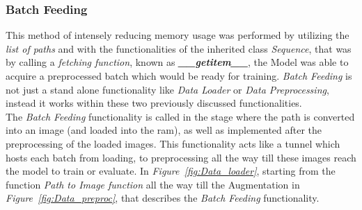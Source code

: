 \documentclass[12pt]{extarticle}
\begin{document}
	\subsubsection{Batch Feeding}\label{batching}
	This method of intensely reducing memory usage was performed by utilizing the \emph{list of paths} and with the functionalities of the inherited class \emph{Sequence}, that was by calling a \emph{fetching function}, known as \emph{\textbf{\_\_getitem\_\_}}, the Model was able to acquire a preprocessed batch which would be ready for training. \emph{Batch Feeding} is not just a stand alone functionality like \emph{Data Loader} or \emph{Data Preprocessing}, instead it works within these two previously discussed functionalities.\\
	The \emph{Batch Feeding} functionality is called in the stage where the path is converted into an image (and loaded into the ram), as well as implemented after the preprocessing of the loaded images. This functionality acts like a tunnel which hosts each batch from loading, to preprocessing all the way till these images reach the model to train or evaluate. In \emph{Figure~\ref{fig:Data_loader}}, starting from the function \emph{Path to Image function} all the way till the Augmentation in \emph{Figure~\ref{fig:Data_preproc}}, that describes the \emph{Batch Feeding} functionality.
	
\end{document}
